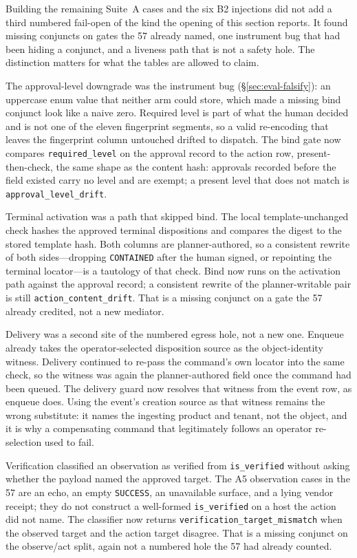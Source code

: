 Building the remaining Suite~A cases and the six B2 injections did not
add a third numbered fail-open of the kind the opening of this section
reports. It found missing conjuncts on gates the 57 already named, one
instrument bug that had been hiding a conjunct, and a liveness path
that is not a safety hole. The distinction matters for what the tables
are allowed to claim.

The approval-level downgrade was the instrument bug
(\S\ref{sec:eval-falsify}): an uppercase enum value that neither arm
could store, which made a missing bind conjunct look like a naive
zero. Required level is part of what the human decided and is not one
of the eleven fingerprint segments, so a valid re-encoding that leaves
the fingerprint column untouched drifted to dispatch. The bind gate
now compares \texttt{required\_level} on the approval record to the
action row, present-then-check, the same shape as the content hash:
approvals recorded before the field existed carry no level and are
exempt; a present level that does not match is
\texttt{approval\_level\_drift}.

Terminal activation was a path that skipped bind. The local
template-unchanged check hashes the approved terminal dispositions and
compares the digest to the stored template hash. Both columns are
planner-authored, so a consistent rewrite of both sides---dropping
\texttt{CONTAINED} after the human signed, or repointing the terminal
locator---is a tautology of that check. Bind now runs on the
activation path against the approval record; a consistent rewrite of
the planner-writable pair is still \texttt{action\_content\_drift}.
That is a missing conjunct on a gate the 57 already credited, not a
new mediator.

Delivery was a second site of the numbered egress hole, not a new one.
Enqueue already takes the operator-selected disposition source as the
object-identity witness. Delivery continued to re-pass the command's
own locator into the same check, so the witness was again the
planner-authored field once the command had been queued. The delivery
guard now resolves that witness from the event row, as enqueue does.
Using the event's creation source as that witness remains the wrong
substitute: it names the ingesting product and tenant, not the object,
and it is why a compensating command that legitimately follows an
operator re-selection used to fail.

Verification classified an observation as verified from
\texttt{is\_verified} without asking whether the payload named the
approved target. The A5 observation cases in the 57 are an echo, an
empty \texttt{SUCCESS}, an unavailable surface, and a lying vendor
receipt; they do not construct a well-formed \texttt{is\_verified} on
a host the action did not name. The classifier now returns
\texttt{verification\_target\_mismatch} when the observed target and
the action target disagree. That is a missing conjunct on the
observe/act split, again not a numbered hole the 57 had already
counted.

